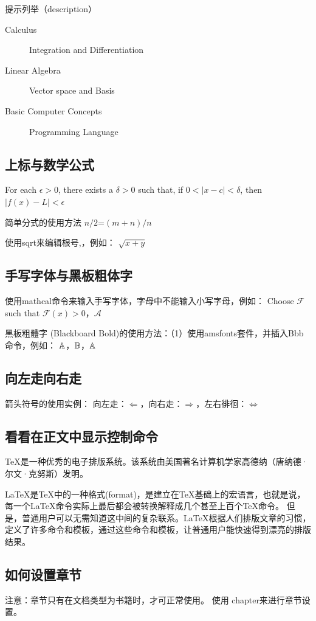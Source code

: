 \documentclass[12pt, a4paper,openany]{book}%
\begin{document}
提示列举（description）
\begin{description}
\item [Calculus] Integration and Differentiation
\item [Linear Algebra] Vector space and Basis
\item [Basic Computer Concepts] Programming Language
\end{description}

\subsection{上标与数学公式}
For each $\epsilon > 0$, there exists a $\delta > 0$
such that, if $0 < |x - c| < \delta$, 
then $|f(x) - L| < \epsilon$

简单分式的使用方法
$n/2$=$(m+n)/n$

使用sqrt来编辑根号,，例如：
$\sqrt{x+y}$

\subsection{手写字体与黑板粗体字}
使用mathcal命令来输入手写字体，字母中不能输入小写字母，例如：
Choose $\mathcal{F}$ such that $\mathcal{F}(x) > 0$，$\mathcal{A}$

黑板粗體字 (Blackboard Bold)的使用方法：（1）使用amsfonts套件，并插入Bbb命令，例如：
$\Bbb{A}$，$\Bbb{B}$，$\Bbb{A}$

\subsection{向左走向右走}
箭头符号的使用实例：
向左走：$\Leftarrow$，向右走：$\Rightarrow$，左右徘徊：$\Longleftrightarrow$

\subsection{看看在正文中显示控制命令}
\TeX{}是一种优秀的电子排版系统。该系统由美国著名计算机学家高德纳（唐纳德·尔文·克努斯）发明。

\LaTeX{}是\TeX{}中的一种格式(format)，是建立在\TeX{}基础上的宏语言，也就是说，
每一个\LaTeX{}命令实际上最后都会被转换解释成几个甚至上百个\TeX{}命令。
但是，普通用户可以无需知道这中间的复杂联系。\LaTeX{}根据人们排版文章的习惯，定义了许多命令和模板，通过这些命令和模板，让普通用户能快速得到漂亮的排版结果。

\subsection{如何设置章节}
注意：章节只有在文档类型为书籍时，才可正常使用。
使用 chapter来进行章节设置。
\end{document}
